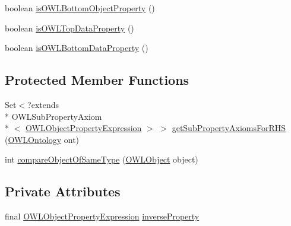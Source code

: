 \begin{DoxyCompactItemize}
\item 
boolean \hyperlink{classuk_1_1ac_1_1manchester_1_1cs_1_1owl_1_1owlapi_1_1_o_w_l_object_inverse_of_impl_a2876c70811275780c0f6990c91f9dc34}{is\-O\-W\-L\-Bottom\-Object\-Property} ()
\item 
boolean \hyperlink{classuk_1_1ac_1_1manchester_1_1cs_1_1owl_1_1owlapi_1_1_o_w_l_object_inverse_of_impl_a1d3e7b8498bba463da9f8710aefea09b}{is\-O\-W\-L\-Top\-Data\-Property} ()
\item 
boolean \hyperlink{classuk_1_1ac_1_1manchester_1_1cs_1_1owl_1_1owlapi_1_1_o_w_l_object_inverse_of_impl_a624bd5effe43866e45cf1f2a67b944dc}{is\-O\-W\-L\-Bottom\-Data\-Property} ()
\end{DoxyCompactItemize}
\subsection*{Protected Member Functions}
\begin{DoxyCompactItemize}
\item 
Set$<$?extends \\*
O\-W\-L\-Sub\-Property\-Axiom\\*
$<$ \hyperlink{interfaceorg_1_1semanticweb_1_1owlapi_1_1model_1_1_o_w_l_object_property_expression}{O\-W\-L\-Object\-Property\-Expression} $>$ $>$ \hyperlink{classuk_1_1ac_1_1manchester_1_1cs_1_1owl_1_1owlapi_1_1_o_w_l_object_inverse_of_impl_af669620b8f030d12d54675a0826b7fe9}{get\-Sub\-Property\-Axioms\-For\-R\-H\-S} (\hyperlink{interfaceorg_1_1semanticweb_1_1owlapi_1_1model_1_1_o_w_l_ontology}{O\-W\-L\-Ontology} ont)
\item 
int \hyperlink{classuk_1_1ac_1_1manchester_1_1cs_1_1owl_1_1owlapi_1_1_o_w_l_object_inverse_of_impl_ac36db10449de14baa585531b56ad0113}{compare\-Object\-Of\-Same\-Type} (\hyperlink{interfaceorg_1_1semanticweb_1_1owlapi_1_1model_1_1_o_w_l_object}{O\-W\-L\-Object} object)
\end{DoxyCompactItemize}
\subsection*{Private Attributes}
\begin{DoxyCompactItemize}
\item 
final \hyperlink{interfaceorg_1_1semanticweb_1_1owlapi_1_1model_1_1_o_w_l_object_property_expression}{O\-W\-L\-Object\-Property\-Expression} \hyperlink{classuk_1_1ac_1_1manchester_1_1cs_1_1owl_1_1owlapi_1_1_o_w_l_object_inverse_of_impl_a868093c9a0f349a17a51723a89b39080}{inverse\-Property}
\end{DoxyCompactItemize}
